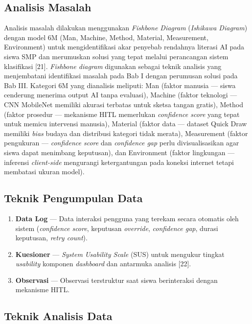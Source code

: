 \documentclass[10pt,twoside,openright]{report}
\begin{document}
\subsection{Analisis Masalah}
\label{subsec:analisis-masalah}

Analisis masalah dilakukan menggunakan \textit{Fishbone Diagram} (\textit{Ishikawa Diagram}) dengan model 6M (Man, Machine, Method, Material, Measurement, Environment) untuk mengidentifikasi akar penyebab rendahnya literasi AI pada siswa SMP dan merumuskan solusi yang tepat melalui perancangan sistem klasifikasi [21]. \textit{Fishbone diagram} digunakan sebagai teknik analisis yang menjembatani identifikasi masalah pada Bab I dengan perumusan solusi pada Bab III. Kategori 6M yang dianalisis meliputi: Man (faktor manusia --- siswa cenderung menerima output AI tanpa evaluasi), Machine (faktor teknologi --- CNN MobileNet memiliki akurasi terbatas untuk sketsa tangan gratis), Method (faktor prosedur --- mekanisme HITL memerlukan \textit{confidence score} yang tepat untuk memicu intervensi manusia), Material (faktor data --- dataset Quick Draw memiliki \textit{bias} budaya dan distribusi kategori tidak merata), Measurement (faktor pengukuran --- \textit{confidence score} dan \textit{confidence gap} perlu divisualisasikan agar siswa dapat menimbang keputusan), dan Environment (faktor lingkungan --- inferensi \textit{client-side} mengurangi ketergantungan pada koneksi internet tetapi membatasi ukuran model).

\subsection{Teknik Pengumpulan Data}
\label{subsec:teknik-pengumpulan-data}

\begin{enumerate}
    \item \textbf{Data Log} --- Data interaksi pengguna yang terekam secara otomatis oleh sistem (\textit{confidence score}, keputusan \textit{override}, \textit{confidence gap}, durasi keputusan, \textit{retry count}).
    \item \textbf{Kuesioner} --- \textit{System Usability Scale} (SUS) untuk mengukur tingkat \textit{usability} komponen \textit{dashboard} dan antarmuka analisis [22].
    \item \textbf{Observasi} --- Observasi terstruktur saat siswa berinteraksi dengan mekanisme HITL.
\end{enumerate}

\subsection{Teknik Analisis Data}
\label{subsec:teknik-analisis-data}
\end{document}

